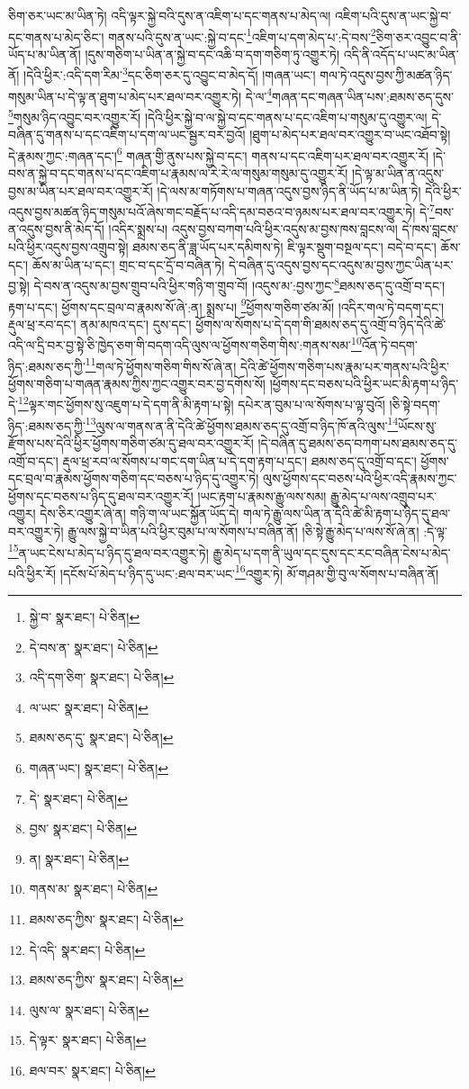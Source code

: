 ཅིག་ཅར་ཡང་མ་ཡིན་ཏེ། འདི་ལྟར་སྐྱེ་བའི་དུས་ན་འཇིག་པ་དང་གནས་པ་མེད་ལ། འཇིག་པའི་དུས་ན་ཡང་སྐྱེ་བ་དང་གནས་པ་མེད་ཅིང་། གནས་པའི་དུས་ན་ཡང་:སྐྱེ་བ་དང་\footnote{སྐྱེ་བ་  སྣར་ཐང་།  པེ་ཅིན། }འཇིག་པ་དག་མེད་པ་:དེ་བས་\footnote{དེ་བས་ན་  སྣར་ཐང་།  པེ་ཅིན། }ཅིག་ཅར་འབྱུང་བ་ནི་ཡོད་པ་མ་ཡིན་ནོ། །དུས་གཅིག་པ་ཡིན་ན་སྐྱེ་བ་དང་འཆི་བ་དག་གཅིག་ཏུ་འགྱུར་ཏེ། འདི་ནི་འདོད་པ་ཡང་མ་ཡིན་ནོ། །དེའི་ཕྱིར་:འདི་དག་རིམ་\footnote{འདི་དག་ཅིག་  སྣར་ཐང་།  པེ་ཅིན། }དང་ཅིག་ཅར་དུ་འབྱུང་བ་མེད་དོ། །གཞན་ཡང་། གལ་ཏེ་འདུས་བྱས་ཀྱི་མཚན་ཉིད་གསུམ་ཡིན་པ་དེ་ལྟ་ན་ཐུག་པ་མེད་པར་ཐལ་བར་འགྱུར་ཏེ། དེ་ལ་\footnote{ལ་ཡང་  སྣར་ཐང་།  པེ་ཅིན། }གཞན་དང་གཞན་ཡིན་པས་:ཐམས་ཅད་དུས་\footnote{ཐམས་ཅད་དུ་  སྣར་ཐང་།  པེ་ཅིན། }གསུམ་ཉིད་འབྱུང་བར་འགྱུར་རོ། །དེའི་ཕྱིར་སྐྱེ་བ་ལ་སྐྱེ་བ་དང་གནས་པ་དང་འཇིག་པ་གསུམ་དུ་འགྱུར་ལ། དེ་བཞིན་དུ་གནས་པ་དང་འཇིག་པ་དག་ལ་ཡང་སྦྱར་བར་བྱའོ། །ཐུག་པ་མེད་པར་ཐལ་བར་འགྱུར་བ་ཡང་འཐོབ་སྟེ། དེ་རྣམས་ཀྱང་:གཞན་དང་།\footnote{གཞན་ཡང་།  སྣར་ཐང་།  པེ་ཅིན། } གཞན་གྱི་ནུས་པས་སྐྱེ་བ་དང་། གནས་པ་དང་འཇིག་པར་ཐལ་བར་འགྱུར་རོ། །དེ་བས་ན་སྐྱེ་བ་དང་གནས་པ་དང་འཇིག་པ་རྣམས་ལ་རེ་རེ་ལ་གསུམ་གསུམ་དུ་འགྱུར་རོ། །དེ་ལྟ་མ་ཡིན་ན་འདུས་བྱས་མ་ཡིན་པར་ཐལ་བར་འགྱུར་རོ། །དེ་ལས་མ་གཏོགས་པ་གཞན་འདུས་བྱས་ཉིད་ནི་ཡོད་པ་མ་ཡིན་ཏེ། དེའི་ཕྱིར་འདུས་བྱས་མཚན་ཉིད་གསུམ་པའོ་ཞེས་གང་བརྗོད་པ་འདི་དམ་བཅའ་བ་ཉམས་པར་ཐལ་བར་འགྱུར་ཏེ། དེ་\footnote{དེ་  སྣར་ཐང་།  པེ་ཅིན། }བས་ན་འདུས་བྱས་ནི་མེད་དོ། །འདིར་སྨྲས་པ། འདུས་བྱས་བཀག་པའི་ཕྱིར་འདུས་མ་བྱས་ཁས་བླངས་ལ། དེ་ཁས་བླངས་པའི་ཕྱིར་འདུས་བྱས་འགྲུབ་སྟེ། ཐམས་ཅད་ནི་ཟླ་ཡོད་པར་དམིགས་ཏེ། ཇི་ལྟར་སྡུག་བསྔལ་དང་། བདེ་བ་དང་། ཆོས་དང་། ཆོས་མ་ཡིན་པ་དང་། གྲང་བ་དང་དྲོ་བ་བཞིན་ཏེ། དེ་བཞིན་དུ་འདུས་བྱས་དང་འདུས་མ་བྱས་ཀྱང་ཡིན་པར་བྱ་སྟེ། དེ་བས་ན་འདུས་མ་བྱས་གྲུབ་པའི་ཕྱིར་གཉི་ག་གྲུབ་བོ། །འདུས་མ་:བྱས་ཀྱང་\footnote{བྱས་  སྣར་ཐང་།  པེ་ཅིན། }ཐམས་ཅད་དུ་འགྲོ་བ་དང་། རྟག་པ་དང་། ཕྱོགས་དང་བྲལ་བ་རྣམས་སོ་ཞེ་:ན། སྨྲས་པ། \footnote{ན།    སྣར་ཐང་།  པེ་ཅིན། }ཕྱོགས་གཅིག་ཙམ་མོ། །འདིར་གལ་ཏེ་བདག་དང་། རྡུལ་ཕྲ་རབ་དང་། ནམ་མཁའ་དང་། དུས་དང་། ཕྱོགས་ལ་སོགས་པ་དེ་དག་གི་ཐམས་ཅད་དུ་འགྲོ་བ་ཉིད་དེའི་ཚེ་འདི་ལ་དྲི་བར་བྱ་སྟེ་ཅི་ཁྱེད་ཅག་གི་བདག་འདི་ལུས་ལ་ཕྱོགས་གཅིག་གིས་:གནས་སམ་\footnote{གནས་མ་  སྣར་ཐང་།  པེ་ཅིན། }འོན་ཏེ་བདག་ཉིད་:ཐམས་ཅད་ཀྱི་\footnote{ཐམས་ཅད་ཀྱིས་  སྣར་ཐང་།  པེ་ཅིན། }གལ་ཏེ་ཕྱོགས་གཅིག་གིས་སོ་ཞེ་ན། དེའི་ཚེ་ཕྱོགས་གཅིག་པས་རྣམ་པར་གནས་པའི་ཕྱིར་ཕྱོགས་གཅིག་པ་གཞན་རྣམས་ཀྱིས་ཀྱང་འགྱུར་བར་བྱ་དགོས་སོ། །ཕྱོགས་དང་བཅས་པའི་ཕྱིར་ཡང་མི་རྟག་པ་ཉིད་དེ་\footnote{དེ་འདི་  སྣར་ཐང་།  པེ་ཅིན། }ལྟར་གང་ཕྱོགས་སུ་འཇུག་པ་དེ་དག་ནི་མི་རྟག་པ་སྟེ། དཔེར་ན་བུམ་པ་ལ་སོགས་པ་ལྟ་བུའོ། །ཅི་སྟེ་བདག་ཉིད་:ཐམས་ཅད་ཀྱི་\footnote{ཐམས་ཅད་ཀྱིས་  སྣར་ཐང་།  པེ་ཅིན། }ལུས་ལ་གནས་ན་ནི་དེའི་ཚེ་ཕྱོགས་ཐམས་ཅད་དུ་འགྲོ་བ་ཉིད་ཁོ་ནའི་ལུས་\footnote{ལུས་ལ་  སྣར་ཐང་།  པེ་ཅིན། }ཡོངས་སུ་རྫོགས་པས་དེའི་ཕྱིར་ཕྱོགས་གཅིག་ཙམ་དུ་ཐལ་བར་འགྱུར་རོ། །དེ་བཞིན་དུ་ཐམས་ཅད་བཀག་པས་ཐམས་ཅད་དུ་འགྲོ་བ་དང་། རྡུལ་ཕྲ་རབ་ལ་སོགས་པ་གང་དག་ཡིན་པ་དེ་དག་རྟག་པ་དང་། ཐམས་ཅད་དུ་འགྲོ་བ་དང་། ཕྱོགས་དང་བྲལ་བ་རྣམས་ཕྱོགས་གཅིག་དང་བཅས་པ་ཉིད་དུ་འགྱུར་ཏེ། ལུས་ཕྱོགས་དང་བཅས་པའི་ཕྱིར་འདི་རྣམས་ཀྱང་ཕྱོགས་དང་བཅས་པ་ཉིད་དུ་ཐལ་བར་འགྱུར་རོ། །ཡང་རྟག་པ་རྣམས་རྒྱུ་ལས་སམ། རྒྱུ་མེད་པ་ལས་འགྲུབ་པར་འགྱུར། དེས་ཅིར་འགྱུར་ཞེ་ན། གཉི་ག་ལ་ཡང་སྐྱོན་ཡོད་དེ། གལ་ཏེ་རྒྱུ་ལས་ཡིན་ན་དེའི་ཚེ་མི་རྟག་པ་ཉིད་དུ་ཐལ་བར་འགྱུར་ཏེ། རྒྱུ་ལས་སྐྱེ་བ་ཡིན་པའི་ཕྱིར་བུམ་པ་ལ་སོགས་པ་བཞིན་ནོ། །ཅི་སྟེ་རྒྱུ་མེད་པ་ལས་སོ་ཞེ་ན། :དེ་ལྟ་\footnote{དེ་ལྟར་  སྣར་ཐང་།  པེ་ཅིན། }ན་ཡང་ངེས་པ་མེད་པ་ཉིད་དུ་ཐལ་བར་འགྱུར་ཏེ། རྒྱུ་མེད་པ་དག་ནི་ཡུལ་དང་དུས་དང་རང་བཞིན་ངེས་པ་མེད་པའི་ཕྱིར་རོ། །དངོས་པོ་མེད་པ་ཉིད་དུ་ཡང་:ཐལ་བར་ཡང་\footnote{ཐལ་བར་  སྣར་ཐང་།  པེ་ཅིན། }འགྱུར་ཏེ། མོ་གཤམ་གྱི་བུ་ལ་སོགས་པ་བཞིན་ནོ། 